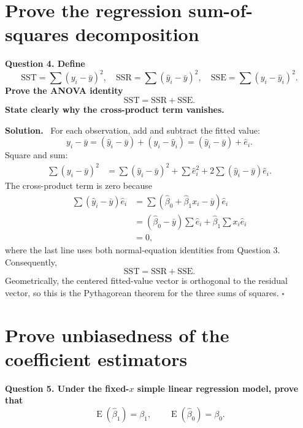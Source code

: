\documentclass[11pt]{article}
\newcommand{\bzero}{\widehat{\beta}_0}
\newcommand{\bone}{\widehat{\beta}_1}
\newcommand{\yhat}{\widehat{y}}
\newcommand{\e}{\widehat{e}}
\newcommand{\E}{\operatorname{E}}
\newenvironment{question}
  {\par\medskip\noindent\color{navy}\bfseries}
  {\par\medskip\color{black}}
\newenvironment{solution}
  {\noindent\color{darkgreen}\textbf{Solution.}\color{black}\ }
  {\hfill$\square$\par\medskip}
\begin{document}
\section{Prove the regression sum-of-squares decomposition}

\begin{question}
Question 4. Define
\[
 \mathrm{SST}=\sum(y_i-\bar y)^2,
 \quad
 \mathrm{SSR}=\sum(\yhat_i-\bar y)^2,
 \quad
 \mathrm{SSE}=\sum(y_i-\yhat_i)^2.
\]
Prove the ANOVA identity
\[
  \boxed{\mathrm{SST}=\mathrm{SSR}+\mathrm{SSE}}.
\]
State clearly why the cross-product term vanishes.
\end{question}

\begin{solution}
For each observation, add and subtract the fitted value:
\[
 y_i-\bar y=(\yhat_i-\bar y)+(y_i-\yhat_i)
             =(\yhat_i-\bar y)+\e_i.
\]
Square and sum:
\begin{align*}
\sum(y_i-\bar y)^2
 &=\sum(\yhat_i-\bar y)^2+\sum\e_i^2
   +2\sum(\yhat_i-\bar y)\e_i.
\end{align*}
The cross-product term is zero because
\begin{align*}
\sum(\yhat_i-\bar y)\e_i
 &=\sum(\bzero+\bone x_i-\bar y)\e_i\\
 &=(\bzero-\bar y)\sum\e_i+\bone\sum x_i\e_i\\
 &=0,
\end{align*}
where the last line uses both normal-equation identities from Question 3.
Consequently,
\[
 \mathrm{SST}=\mathrm{SSR}+\mathrm{SSE}.
\]
Geometrically, the centered fitted-value vector is orthogonal to the residual
vector, so this is the Pythagorean theorem for the three sums of squares.
\end{solution}

\section{Prove unbiasedness of the coefficient estimators}

\begin{question}
Question 5. Under the fixed-$x$ simple linear regression model, prove that
\[
  \boxed{\E(\bone)=\beta_1},
  \qquad
  \boxed{\E(\bzero)=\beta_0}.
\]
\end{question}
\end{document}
